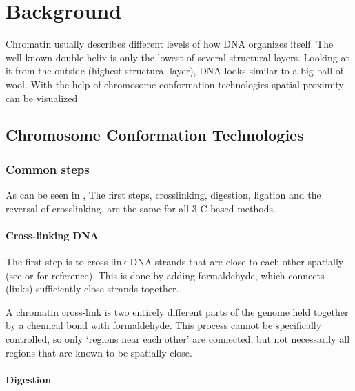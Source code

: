 \chapter{Background}\label{chap:background}






Chromatin usually describes different levels of how DNA organizes itself. The
well-known double-helix is only the lowest of several structural layers.
Looking at it from the outside (highest structural layer), DNA looks similar to
a big ball of wool. With the help of chromosome conformation technologies
spatial proximity can be visualized


\section{Chromosome Conformation Technologies}\label{sec:cct}



\subsection{Common steps}\label{sec:common}

As can be seen in , The first steps, crosslinking, digestion,
ligation and the reversal of crosslinking, are the same for all 3-C-based methods.

\subsubsection{Cross-linking DNA}\label{sec:crosslinking}

The first step is to cross-link DNA strands that are close to each other
spatially (see  or  for reference). This is done by adding
formaldehyde, which connects (links) sufficiently close strands together.

A chromatin cross-link is two entirely different parts of the genome held
together by a chemical bond with formaldehyde. This process cannot be
specifically controlled, so only `regions near each other' are connected, but
not necessarily all regions that are known to be spatially close.

\subsubsection{Digestion}\label{sec:digestion}

